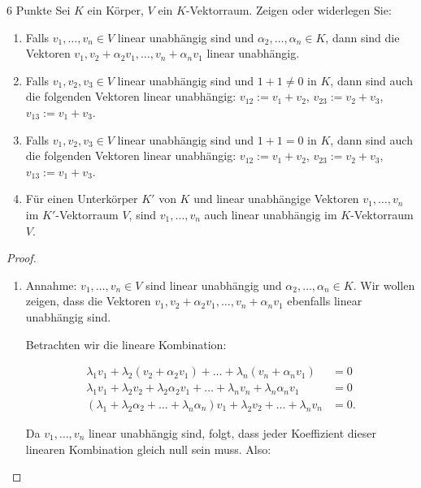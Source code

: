 \documentclass{problemset}
\begin{document}
\begin{problem}{6 Punkte}
Sei $K$ ein Körper, $V$ ein $K$-Vektorraum. Zeigen oder widerlegen Sie:
\begin{enumerate}
	\item Falls $v_1, \ldots, v_n \in V$ linear unabhängig sind und $\alpha_2, \ldots, \alpha_n \in K$, dann sind die Vektoren $v_1, v_2 + \alpha_2v_1, \ldots, v_n + \alpha_nv_1$ linear unabhängig.
	\item Falls $v_1, v_2, v_3 \in V$ linear unabhängig sind und $1 + 1 \neq 0$ in $K$, dann sind auch die folgenden Vektoren linear unabhängig: $v_{12} := v_1 + v_2$, $v_{23} := v_2 + v_3$, $v_{13} := v_1 + v_3$.
	\item Falls $v_1, v_2, v_3 \in V$ linear unabhängig sind und $1 + 1 = 0$ in $K$, dann sind auch die folgenden Vektoren linear unabhängig: $v_{12} := v_1 + v_2$, $v_{23} := v_2 + v_3$, $v_{13} := v_1 + v_3$.
	\item Für einen Unterkörper $K'$ von $K$ und linear unabhängige Vektoren $v_1, \ldots, v_n$ im $K'$-Vektorraum $V$, sind $v_1, \ldots, v_n$ auch linear unabhängig im $K$-Vektorraum $V$.
\end{enumerate}
\begin{proof}
	$ $

	\begin{enumerate}
		\item Annahme: $v_1, \ldots, v_n \in V$ sind linear unabhängig und $\alpha_2, \ldots, \alpha_n \in K$.
		      Wir wollen zeigen, dass die Vektoren $v_1, v_2 + \alpha_2v_1, \ldots, v_n + \alpha_nv_1$ ebenfalls linear unabhängig sind.

		      Betrachten wir die lineare Kombination:

		      \begin{align*}
			      \lambda_1 v_1 + \lambda_2 (v_2 + \alpha_2 v_1) + \ldots + \lambda_n (v_n + \alpha_n v_1)               & = 0  \\
			      \lambda_1 v_1 + \lambda_2v_2 + \lambda_2\alpha_2v_1 + \ldots + \lambda_nv_n + \lambda_n\alpha_nv_1     & = 0  \\
			      (\lambda_1 + \lambda_2\alpha_2 + \ldots + \lambda_n\alpha_n)v_1 + \lambda_2v_2 + \ldots + \lambda_nv_n & = 0.
		      \end{align*}

		      Da $v_1, \ldots, v_n$ linear unabhängig sind, folgt, dass jeder Koeffizient dieser linearen Kombination gleich null sein muss.
		      Also:


\end{enumerate}
\end{proof}
\end{problem}
\end{document}
